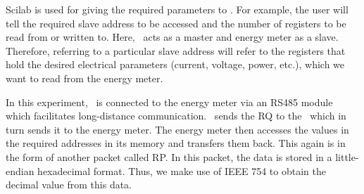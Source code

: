 Scilab is used for giving the required parameters to \arduino. For
example, the user will tell the required slave address to be accessed
and the number of registers to be read from or written to. Here,
\arduino\ acts as a master and energy meter as a slave. Therefore,
referring to a particular slave address will refer to the registers
that hold the desired electrical parameters (current, voltage, power, etc.), which we want to read from the energy meter.

In this experiment, \arduino\ is connected to the energy meter via an RS485 module which facilitates long-distance communication. 
\scilab\ sends the RQ to the \arduino\, which in turn sends it to the
energy meter. The energy meter then accesses the values in the
required addresses in its memory and transfers them back. This again
is in the form of another packet called RP. In this packet, the data is stored in a little-endian hexadecimal format. Thus, we make use of IEEE 754 to obtain the decimal value from this data. 


